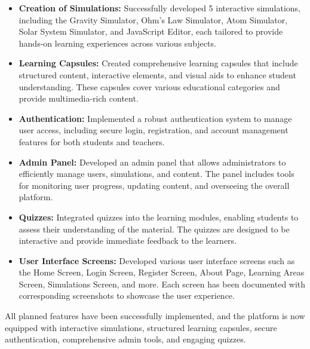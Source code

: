 \begin{itemize}[leftmargin=1cm]
    \item \textbf{Creation of Simulations:} Successfully developed 5 interactive simulations, including the Gravity Simulator, Ohm's Law Simulator, Atom Simulator, Solar System Simulator, and JavaScript Editor, each tailored to provide hands-on learning experiences across various subjects.
    
    \item \textbf{Learning Capsules:} Created comprehensive learning capsules that include structured content, interactive elements, and visual aids to enhance student understanding. These capsules cover various educational categories and provide multimedia-rich content.
    
    \item \textbf{Authentication:} Implemented a robust authentication system to manage user access, including secure login, registration, and account management features for both students and teachers.
    
    \item \textbf{Admin Panel:} Developed an admin panel that allows administrators to efficiently manage users, simulations, and content. The panel includes tools for monitoring user progress, updating content, and overseeing the overall platform.
    
    \item \textbf{Quizzes:} Integrated quizzes into the learning modules, enabling students to assess their understanding of the material. The quizzes are designed to be interactive and provide immediate feedback to the learners.
    
    \item \textbf{User Interface Screens:} Developed various user interface screens such as the Home Screen, Login Screen, Register Screen, About Page, Learning Areas Screen, Simulations Screen, and more. Each screen has been documented with corresponding screenshots to showcase the user experience.
\end{itemize}

All planned features have been successfully implemented, and the platform is now equipped with interactive simulations, structured learning capsules, secure authentication, comprehensive admin tools, and engaging quizzes.
\newpage
